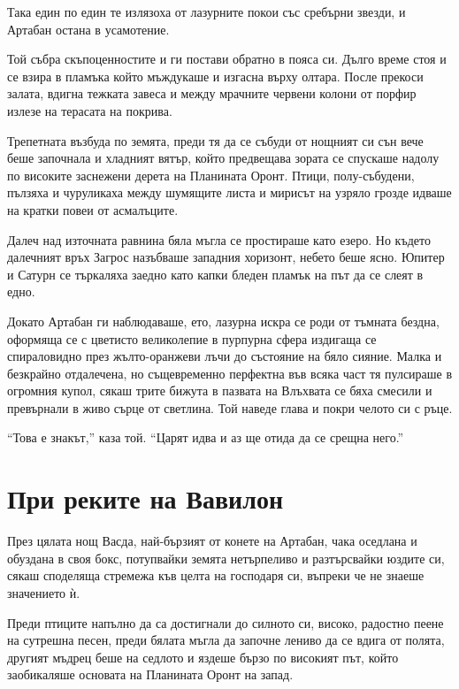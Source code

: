 \documentclass[oneside,10pt]{memoir}
\begin{document}
Така един по един те излязоха от лазурните покои със сребърни звезди, и
Артабан остана в усамотение.

Той събра скъпоценностите и ги постави обратно в пояса си. Дълго време стоя и се
взира в пламъка който мъждукаше и изгасна върху олтара. После прекоси залата,
вдигна тежката завеса и между мрачните червени колони от порфир излезе на
терасата на покрива.

Трепетната възбуда по земята, преди тя да се събуди от нощният си сън вече беше
започнала и хладният вятър, който предвещава зората се спускаше надолу по
високите заснежени дерета на Планината Оронт. Птици, полу-събудени, пълзяха и
чуруликаха между шумящите листа и мирисът на узряло грозде идваше на кратки
повеи от асмалъците.

Далеч над източната равнина бяла мъгла се простираше като езеро. Но където
далечният връх Загрос назъбваше западния хоризонт, небето беше ясно. Юпитер и
Сатурн се търкаляха заедно като капки бледен пламък на път да се слеят в едно.

Докато Артабан ги наблюдаваше, ето, лазурна искра се роди от тъмната бездна,
оформяща се с цветисто великолепие в пурпурна сфера издигаща се спираловидно
през жълто-оранжеви лъчи до състояние на бяло сияние. Малка и безкрайно
отдалечена, но същевременно перфектна във всяка част тя пулсираше в огромния
купол, сякаш трите бижута в пазвата на Влъхвата се бяха смесили и превърнали в
живо сърце от светлина. Той наведе глава и покри челото си с ръце.

``Това е знакът,'' каза той. ``Царят идва и аз ще отида да се срещна него.''

\part{При реките на Вавилон}

През цялата нощ Васда, най-бързият от конете на Артабан, чака оседлана и
обуздана в своя бокс, потупвайки земята нетърпеливо и разтърсвайки юздите си,
сякаш споделяща стремежа къв целта на господаря си, въпреки че не знаеше
значението ѝ.

Преди птиците напълно да са достигнали до силното си, високо, радостно пеене на
сутрешна песен, преди бялата мъгла да започне лениво да се вдига от полята,
другият мъдрец беше на седлото и яздеше бързо по високият път, който заобикаляше
основата на Планината Оронт на запад.
\end{document}
